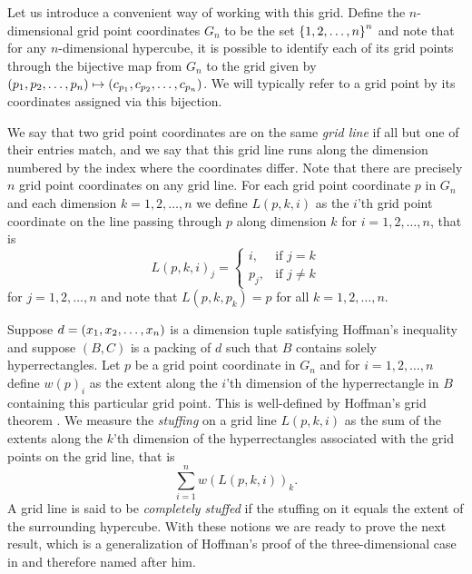 \noindent Let us introduce a convenient way of working with this grid. Define the $n$-dimen\-sional grid point coordinates $G_n$ to be the set $\left\{ 1, 2, \dotsc, n \right\}^n$ and note that for any $n$-dimensional hypercube, it is possible to identify each of its grid points through the bijective map from $G_n$ to the grid given by $\left( p_1, p_2, \dotsc, p_n \right) \mapsto \left( c_{p_1}, c_{p_2}, \dotsc, c_{p_n} \right)$. We will typically refer to a grid point by its coordinates assigned via this bijection.

We say that two grid point coordinates are on the same \textit{grid line} if all but one of their entries match, and we say that this grid line runs along the dimension numbered by the index where the coordinates differ. Note that there are precisely $n$ grid point coordinates on any grid line. For each grid point coordinate $p$ in $G_n$ and each dimension $k = 1, 2, \dotsc, n$ we define $L(p, k, i)$ as the $i$'th grid point coordinate on the line passing through $p$ along dimension $k$ for $i = 1, 2, \dotsc, n$, that is
\[
L(p, k, i)_j =
\begin{cases}
i,   & \text{if } j = k \\
p_j, & \text{if } j \neq k
\end{cases}
\]
for $j = 1, 2, \dotsc, n$ and note that $L(p, k, p_k) = p$ for all $k = 1, 2, \dotsc, n$.

Suppose $d = \left( x_1, x_2, \dotsc, x_n \right)$ is a dimension tuple satisfying Hoffman's inequality and suppose $(B, C)$ is a packing of $d$ such that $B$ contains solely hyperrectangles. Let $p$ be a grid point coordinate in $G_n$ and for $i = 1, 2, \dotsc, n$ define $w(p)_i$ as the extent along the $i$'th dimension of the hyperrectangle in $B$ containing this particular grid point. This is well-defined by Hoffman's grid theorem . We measure the \textit{stuffing} on a grid line $L(p, k, i)$ as the sum of the extents along the $k$'th dimension of the hyperrectangles associated with the grid points on the grid line, that is
\[
\sum_{i = 1}^n w(L(p, k, i))_k.
\]
A grid line is said to be \textit{completely stuffed} if the stuffing on it equals the extent of the surrounding hypercube. With these notions we are ready to prove the next result, which is a generalization of Hoffman's proof of the three-dimensional case in \cite[p. 220]{Hoffman1981} and therefore named after him.


